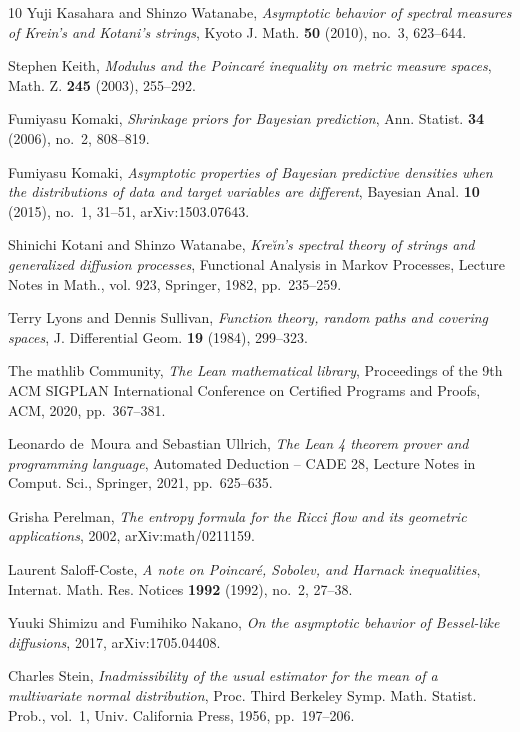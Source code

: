 \documentclass[11pt]{amsart}
\theoremstyle{plain}
\theoremstyle{definition}
\theoremstyle{remark}
\begin{document}
{\begin{thebibliography}{10}
Yuji Kasahara and Shinzo Watanabe, \emph{Asymptotic behavior of spectral
  measures of {K}rein's and {K}otani's strings}, Kyoto J. Math. \textbf{50}
  (2010), no.~3, 623--644.

Stephen Keith, \emph{Modulus and the {P}oincar\'e inequality on metric measure
  spaces}, Math. Z. \textbf{245} (2003), 255--292.

Fumiyasu Komaki, \emph{Shrinkage priors for {B}ayesian prediction}, Ann.
  Statist. \textbf{34} (2006), no.~2, 808--819.

Fumiyasu Komaki, \emph{Asymptotic properties of {B}ayesian predictive densities
  when the distributions of data and target variables are different}, Bayesian
  Anal. \textbf{10} (2015), no.~1, 31--51, arXiv:1503.07643.

Shinichi Kotani and Shinzo Watanabe, \emph{Kre{\u\i}n's spectral theory of
  strings and generalized diffusion processes}, Functional Analysis in Markov
  Processes, Lecture Notes in Math., vol. 923, Springer, 1982, pp.~235--259.

Terry Lyons and Dennis Sullivan, \emph{Function theory, random paths and
  covering spaces}, J. Differential Geom. \textbf{19} (1984), 299--323.

The mathlib Community, \emph{The {L}ean mathematical library}, Proceedings of
  the 9th ACM SIGPLAN International Conference on Certified Programs and
  Proofs, ACM, 2020, pp.~367--381.

Leonardo de~Moura and Sebastian Ullrich, \emph{The {L}ean 4 theorem prover and
  programming language}, Automated Deduction -- CADE 28, Lecture Notes in
  Comput. Sci., Springer, 2021, pp.~625--635.

Grisha Perelman, \emph{The entropy formula for the {R}icci flow and its
  geometric applications}, 2002, arXiv:math/0211159.

Laurent Saloff-Coste, \emph{A note on {P}oincar\'e, {S}obolev, and {H}arnack
  inequalities}, Internat. Math. Res. Notices \textbf{1992} (1992), no.~2,
  27--38.

Yuuki Shimizu and Fumihiko Nakano, \emph{On the asymptotic behavior of
  {B}essel-like diffusions}, 2017, arXiv:1705.04408.

Charles Stein, \emph{Inadmissibility of the usual estimator for the mean of a
  multivariate normal distribution}, Proc. Third Berkeley Symp. Math. Statist.
  Prob., vol.~1, Univ. California Press, 1956, pp.~197--206.


\end{thebibliography}}
\end{document}
